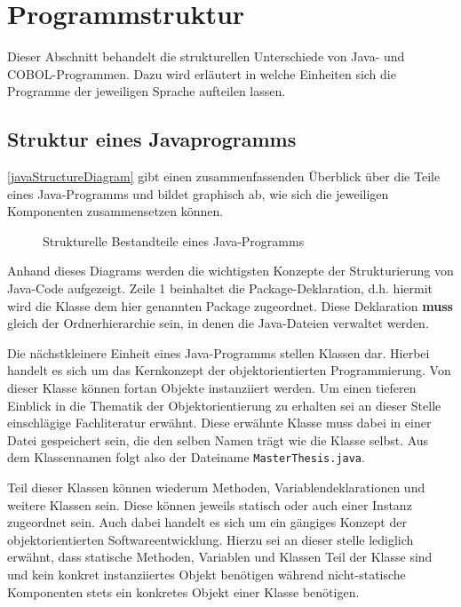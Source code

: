 \section{Programmstruktur}\label{sec:structure}
Dieser Abschnitt behandelt die strukturellen Unterschiede von Java- und COBOL-Programmen. Dazu wird erläutert in welche Einheiten sich die Programme der jeweiligen Sprache aufteilen lassen. 

\subsection*{Struktur eines Javaprogramms}
\autoref{javaStructureDiagram} gibt einen zusammenfassenden Überblick über die Teile eines Java-Programms und bildet graphisch ab, wie sich die jeweiligen Komponenten zusammensetzen können.

\begin{figure}[H]
    \centering
    \resizebox{.9\linewidth}{!}{\unskip}
    \caption{Strukturelle Bestandteile eines Java-Programms \label{javaStructureDiagram}}
\end{figure}

Anhand dieses Diagrams werden die wichtigsten Konzepte der Strukturierung von Java-Code aufgezeigt. Zeile 1 beinhaltet die Package-Deklaration, d.h. hiermit wird die Klasse dem hier genannten Package zugeordnet. Diese Deklaration \textbf{muss} gleich der Ordnerhierarchie sein, in denen die Java-Dateien verwaltet werden. 

Die nächstkleinere Einheit eines Java-Programms stellen Klassen dar. Hierbei handelt es sich um das Kernkonzept der objektorientierten Programmierung. Von dieser Klasse können fortan Objekte instanziiert werden. Um einen tieferen Einblick in die Thematik der Objektorientierung zu erhalten sei an dieser Stelle einschlägige Fachliteratur erwähnt. Diese erwähnte Klasse muss dabei in einer Datei gespeichert sein, die den selben Namen trägt wie die Klasse selbst. Aus dem Klassennamen  folgt also der Dateiname \texttt{MasterThesis.java}.

Teil dieser Klassen können wiederum Methoden, Variablendeklarationen und weitere Klassen sein. Diese können jeweils statisch oder auch einer Instanz zugeordnet sein. Auch dabei handelt es sich um ein gängiges Konzept der objektorientierten Softwareentwicklung. Hierzu sei an dieser stelle lediglich erwähnt, dass statische Methoden, Variablen und Klassen Teil der Klasse sind und kein konkret instanziiertes Objekt benötigen während nicht-statische Komponenten stets ein konkretes Objekt einer Klasse benötigen.

